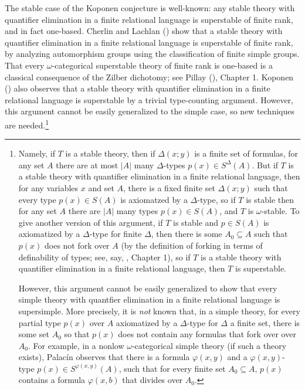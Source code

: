 \documentclass[11pt]{amsart}
\theoremstyle{definition}
\theoremstyle{remark}
\numberwithin{equation}{section}
\begin{document}
The stable case of the Koponen conjecture is well-known: any stable theory with quantifier elimination in a finite relational language is superstable of finite rank, and in fact one-based. Cherlin and Lachlan (\cite{CL20}) show that a stable theory with quantifier elimination in a finite relational language is superstable of finite rank, by analyzing automorphism groups using the classification of finite simple groups. That every $\omega$-categorical superstable theory of finite rank is one-based is a classical consequence of the Zilber dichotomy; see Pillay (\cite{P96}), Chapter 1. Koponen (\cite{Kop17}) also observes that a stable theory with quantifier elimination in a finite relational language is superstable by a trivial type-counting argument. However, this argument cannot be easily generalized to the simple case, so new techniques are needed.\footnote{Namely, if $T$ is a stable theory, then if $\Delta(x; y)$ is a finite set of formulas, for any set $A$ there are at most $|A|$ many $\Delta$-types $p(x) \in S^{\Delta}(A)$. But if $T$ is a stable theory with quantifier elimination in a finite relational language, then for any variables $x$ and set $A$, there is a fixed finite set $\Delta(x; y)$ such that every type $p(x) \in S(A)$ is axiomatzed by a $\Delta$-type, so if $T$ is stable then for any set $A$ there are $|A|$ many types $p(x) \in S(A)$, and $T$ is $\omega$-stable. To give another version of this argument, if $T$ is stable and $p\in S(A)$ is axiomatized by a $\Delta$-type for finite $\Delta$, then there is some $A_{0} \subseteq A$ such that $p(x)$ does not fork over $A$ (by the definition of forking in terms of definability of types; see, say, \cite{P96}, Chapter 1), so if $T$ is a stable theory with quantifier elimination in a finite relational language, then $T$ is superstable.

However, this argument cannot be easily generalized to show that every simple theory with quantfier elimination in a finite relational language is supersimple. More precisely, it is \textit{not} known that, in a simple theory, for every partial type $p(x)$ over $A$ axiomatized by a $\Delta$-type for $\Delta$ a finite set, there is some set $A_{0}$ so that $p(x)$ does not contain any formulas that fork over over $A_{0}$. For example, in a nonlow $\omega$-categorical simple theory (if such a theory exists),  Palac\'in \cite{palacin2012omega} observes that there is a formula $\varphi(x, y)$ and a $\varphi(x, y)$-type $p(x) \in S^{\varphi(x, y)}(A)$, such that for every finite set $A_{0} \subseteq A$, $p(x)$ contains a formula $\varphi(x,b)$ that divides over $A_{0}$.

}
\end{document}
